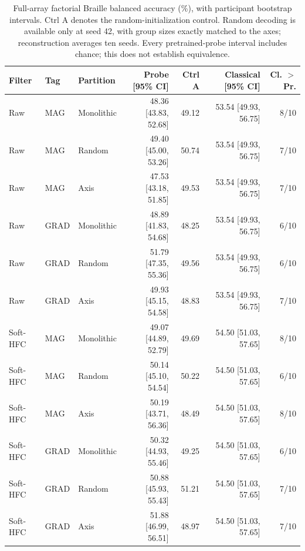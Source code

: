 \begin{table}[htbp]\centering\small
\begin{tabular}{lllrrrr}
\toprule
Filter & Tag & Partition & Probe [95\% CI] & Ctrl A & Classical [95\% CI] & Cl. $>$ Pr. \\
\midrule
Raw & MAG & Monolithic & 48.36 [43.83, 52.68] & 49.12 & 53.54 [49.93, 56.75] & 8/10 \\
Raw & MAG & Random & 49.40 [45.00, 53.26] & 50.74 & 53.54 [49.93, 56.75] & 7/10 \\
Raw & MAG & Axis & 47.53 [43.18, 51.85] & 49.53 & 53.54 [49.93, 56.75] & 7/10 \\
Raw & GRAD & Monolithic & 48.89 [41.83, 54.68] & 48.25 & 53.54 [49.93, 56.75] & 6/10 \\
Raw & GRAD & Random & 51.79 [47.35, 55.36] & 49.56 & 53.54 [49.93, 56.75] & 6/10 \\
Raw & GRAD & Axis & 49.93 [45.15, 54.58] & 48.83 & 53.54 [49.93, 56.75] & 7/10 \\
Soft-HFC & MAG & Monolithic & 49.07 [44.89, 52.79] & 49.69 & 54.50 [51.03, 57.65] & 8/10 \\
Soft-HFC & MAG & Random & 50.14 [45.10, 54.54] & 50.22 & 54.50 [51.03, 57.65] & 6/10 \\
Soft-HFC & MAG & Axis & 50.19 [43.71, 56.36] & 48.49 & 54.50 [51.03, 57.65] & 8/10 \\
Soft-HFC & GRAD & Monolithic & 50.32 [44.93, 55.46] & 49.25 & 54.50 [51.03, 57.65] & 6/10 \\
Soft-HFC & GRAD & Random & 50.88 [45.93, 55.43] & 51.21 & 54.50 [51.03, 57.65] & 7/10 \\
Soft-HFC & GRAD & Axis & 51.88 [46.99, 56.51] & 48.97 & 54.50 [51.03, 57.65] & 7/10 \\
\bottomrule\end{tabular}
\caption{Full-array factorial Braille balanced accuracy (\%), with participant bootstrap intervals. Ctrl A denotes the random-initialization control. Random decoding is available only at seed 42, with group sizes exactly matched to the axes; reconstruction averages ten seeds. Every pretrained-probe interval includes chance; this does not establish equivalence.}
\label{tab:s-factorial-decoding}\end{table}

